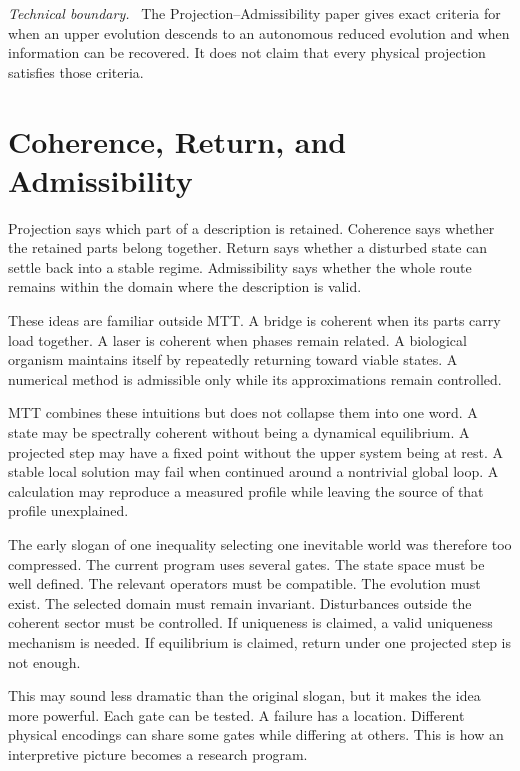\documentclass[11pt,openany]{book}
\newenvironment{technicalboundary}
  {\par\small\noindent\textit{Technical boundary.}\ }
  {\par}
\begin{document}
\begin{technicalboundary}
The Projection--Admissibility paper gives exact criteria for when an upper
evolution descends to an autonomous reduced evolution and when information
can be recovered. It does not claim that every physical projection satisfies
those criteria.
\end{technicalboundary}

\chapter{Coherence, Return, and Admissibility}

Projection says which part of a description is retained. Coherence says
whether the retained parts belong together. Return says whether a disturbed
state can settle back into a stable regime. Admissibility says whether the
whole route remains within the domain where the description is valid.

These ideas are familiar outside MTT. A bridge is coherent when its parts
carry load together. A laser is coherent when phases remain related. A
biological organism maintains itself by repeatedly returning toward viable
states. A numerical method is admissible only while its approximations remain
controlled.

MTT combines these intuitions but does not collapse them into one word. A
state may be spectrally coherent without being a dynamical equilibrium. A
projected step may have a fixed point without the upper system being at rest.
A stable local solution may fail when continued around a nontrivial global
loop. A calculation may reproduce a measured profile while leaving the
source of that profile unexplained.

The early slogan of one inequality selecting one inevitable world was
therefore too compressed. The current program uses several gates. The state
space must be well defined. The relevant operators must be compatible. The
evolution must exist. The selected domain must remain invariant. Disturbances
outside the coherent sector must be controlled. If uniqueness is claimed, a
valid uniqueness mechanism is needed. If equilibrium is claimed, return under
one projected step is not enough.

This may sound less dramatic than the original slogan, but it makes the idea
more powerful. Each gate can be tested. A failure has a location. Different
physical encodings can share some gates while differing at others. This is
how an interpretive picture becomes a research program.
\end{document}

